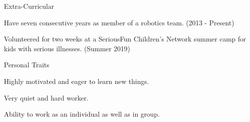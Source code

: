 \documentclass{resume} %
\begin{document}


\newpage

\begin{rSection}{Extra-Curricular} \itemsep -3pt
\item Have seven consecutive years as member of a robotics team. (2013 - Present)
\item Volunteered for two weeks at a SeriousFun Children's Network summer camp for kids 
	with serious illnesses. (Summer 2019)
\end{rSection}

\begin{rSection}{Personal Traits}
\item Highly motivated and eager to learn new things.
\item Very quiet and hard worker.
\item Ability to work as an individual as well as in group.
\end{rSection}
\end{document}
